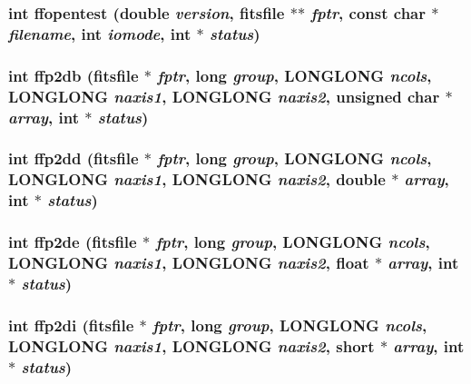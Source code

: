 \subsubsection{\setlength{\rightskip}{0pt plus 5cm}int ffopentest (double {\em version}, \bf{fitsfile} $\ast$$\ast$ {\em fptr}, const char $\ast$ {\em filename}, int {\em iomode}, int $\ast$ {\em status})}\label{fitsio__64_8h_9c71ba8e466791b2eac6de1ca9848f4c}


\subsubsection{\setlength{\rightskip}{0pt plus 5cm}int ffp2db (\bf{fitsfile} $\ast$ {\em fptr}, long {\em group}, \bf{LONGLONG} {\em ncols}, \bf{LONGLONG} {\em naxis1}, \bf{LONGLONG} {\em naxis2}, unsigned char $\ast$ {\em array}, int $\ast$ {\em status})}\label{fitsio__64_8h_8e43e1cab4a5cdaa87d44ed10bd52298}


\subsubsection{\setlength{\rightskip}{0pt plus 5cm}int ffp2dd (\bf{fitsfile} $\ast$ {\em fptr}, long {\em group}, \bf{LONGLONG} {\em ncols}, \bf{LONGLONG} {\em naxis1}, \bf{LONGLONG} {\em naxis2}, double $\ast$ {\em array}, int $\ast$ {\em status})}\label{fitsio__64_8h_8add04b815d7489f9beeb3dd43857843}


\subsubsection{\setlength{\rightskip}{0pt plus 5cm}int ffp2de (\bf{fitsfile} $\ast$ {\em fptr}, long {\em group}, \bf{LONGLONG} {\em ncols}, \bf{LONGLONG} {\em naxis1}, \bf{LONGLONG} {\em naxis2}, float $\ast$ {\em array}, int $\ast$ {\em status})}\label{fitsio__64_8h_d22120fc89698ea1c5d54ec66c038dce}


\subsubsection{\setlength{\rightskip}{0pt plus 5cm}int ffp2di (\bf{fitsfile} $\ast$ {\em fptr}, long {\em group}, \bf{LONGLONG} {\em ncols}, \bf{LONGLONG} {\em naxis1}, \bf{LONGLONG} {\em naxis2}, short $\ast$ {\em array}, int $\ast$ {\em status})}\label{fitsio__64_8h_0fa81f7a8cdf97afcb174e6dc024f080}


